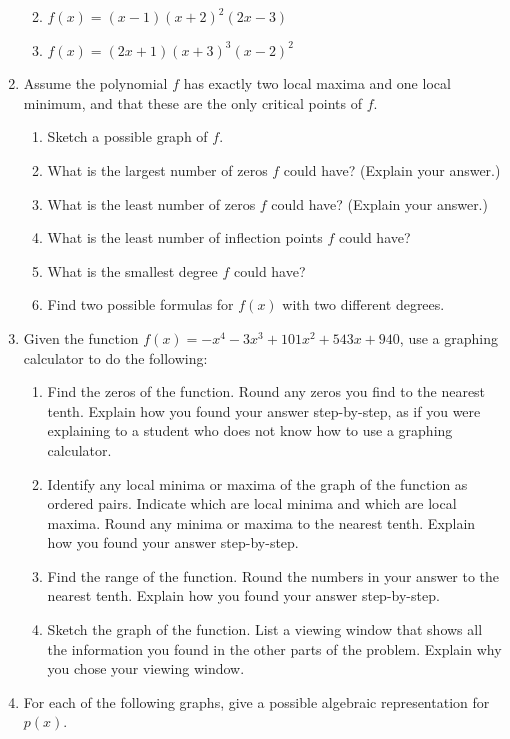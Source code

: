 \documentclass[
]{book}
\providecommand{\tightlist}{%
  \setlength{\itemsep}{0pt}\setlength{\parskip}{0pt}}
\theoremstyle{definition}
\theoremstyle{definition}
\theoremstyle{definition}
\theoremstyle{definition}
\theoremstyle{remark}
\begin{document}
\begin{enumerate}
  \begin{enumerate}
  \def\labelenumii{\alph{enumii}.}
  \tightlist
  \item
    \({\displaystyle f(x)=(x-1)(x+2)^2(2x-3)}\)
  \item
    \({\displaystyle f(x)=(2x+1)(x+3)^3(x-2)^2}\)
  \end{enumerate}
\item
  Assume the polynomial \(f\) has exactly two local maxima and one local minimum, and that these are the only critical points of \(f\).

  \begin{enumerate}
  \def\labelenumii{\alph{enumii}.}
  \tightlist
  \item
    Sketch a possible graph of \(f\).
  \item
    What is the largest number of zeros \(f\) could have? (Explain your answer.)
  \item
    What is the least number of zeros \(f\) could have? (Explain your answer.)
  \item
    What is the least number of inflection points \(f\) could have?
  \item
    What is the smallest degree \(f\) could have?
  \item
    Find two possible formulas for \(f(x)\) with two different degrees.
  \end{enumerate}
\item
  Given the function \(f(x)=-x^4-3x^3+101x^2+543x+940\), use a graphing calculator to do the following:

  \begin{enumerate}
  \def\labelenumii{\alph{enumii}.}
  \tightlist
  \item
    Find the zeros of the function. Round any zeros you find to the nearest tenth. Explain how you found your answer step-by-step, as if you were explaining to a student who does not know how to use a graphing calculator.
  \item
    Identify any local minima or maxima of the graph of the function as ordered pairs. Indicate which are local minima and which are local maxima. Round any minima or maxima to the nearest tenth. Explain how you found your answer step-by-step.
  \item
    Find the range of the function. Round the numbers in your answer to the nearest tenth. Explain how you found your answer step-by-step.
  \item
    Sketch the graph of the function. List a viewing window that shows all the information you found in the other parts of the problem. Explain why you chose your viewing window.
  \end{enumerate}
\item
  For each of the following graphs, give a possible algebraic representation for \(p(x)\).
\end{enumerate}
\end{document}
